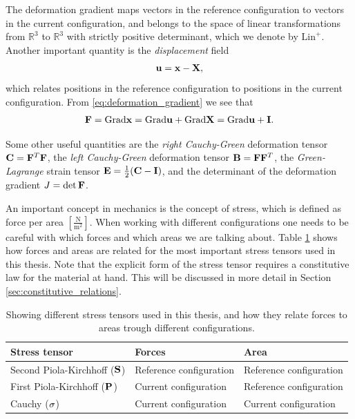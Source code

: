 The deformation gradient maps vectors in the reference configuration to
vectors in the current configuration, and belongs to the space of
linear transformations from $\mathbb{R}^3$ to $\mathbb{R}^3$ with
strictly positive determinant, which we denote by
$\mathrm{Lin}^+$. Another important quantity is the
\emph{displacement} field  
\begin{align}
  \mathbf{u} = \mathbf{x}-\mathbf{X}, 
  \label{eq:displacement}
\end{align}
which relates positions in the reference configuration to positions
in the current configuration. From \eqref{eq:deformation_gradient} we
see that
\begin{align}
  \mathbf{F} = \mathrm{Grad} \mathbf{x} = \mathrm{Grad} \mathbf{u} + \mathrm{Grad} \mathbf{X} = \mathrm{Grad} \mathbf{u} + \mathbf{I}.
\end{align}

Some other useful quantities are the \emph{right Cauchy-Green} deformation
tensor $\mathbf{C} = \mathbf{F}^T\mathbf{F}$, the \emph{left Cauchy-Green} deformation tensor
$\mathbf{B} = \mathbf{F}\mathbf{F}^T$, the \emph{Green-Lagrange} strain tensor
$\mathbf{E} = \frac{1}{2}(\mathbf{C} - \mathbf{I})$, and the determinant of the
deformation gradient $J = \det \mathbf{F}$.

An important concept in mechanics is the concept of stress, which is
defined as force per area
$\left[\frac{\mathrm{N}}{\mathrm{m}^2}\right]$. When working with
different configurations one needs to be careful with which forces and
which areas we are talking about. Table \ref{tab:stress_tensor}
shows how forces and areas are related for the most important stress
tensors used in this thesis. Note that the explicit form of the stress
tensor requires a constitutive law for the material at hand. This will
be discussed in more detail in Section \ref{sec:constitutive_relations}.

\begin{table}[h]
  \centering
  \begin{tabular}{lll}
    \toprule
    Stress tensor & Forces & Area \\
    \midrule
    Second Piola-Kirchhoff ($\mathbf{S}$) & Reference configuration & Reference configuration \\
    First Piola-Kirchhoff ($\mathbf{P}$) & Current configuration  &  Reference configuration \\
    Cauchy ($\mathbf{\sigma}$) &  Current configuration & Current configuration  \\
    \bottomrule
  \end{tabular}
  \caption{\label{tab:stress_tensor}Showing different stress tensors
    used in this thesis, and how
    they relate forces to areas trough different configurations.}
\end{table}



